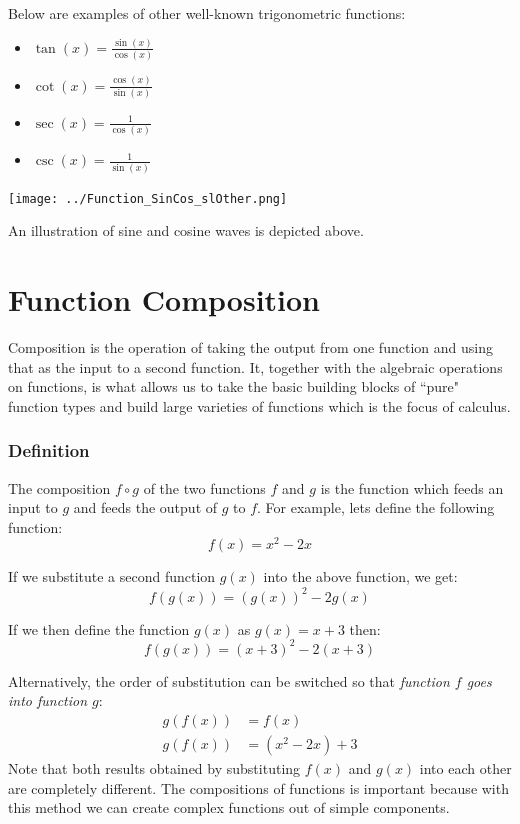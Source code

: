 \documentclass[11pt,oneside]{book}              %
\begin{document}
Below are examples of other well-known trigonometric functions:
\begin{itemize}
	\item $\tan(x) = \frac{\sin(x)}{\cos(x)}$
	\item $\cot(x) = \frac{\cos(x)}{\sin(x)}$
	\item $\sec(x) = \frac{1}{\cos(x)}$
	\item $\csc(x) = \frac{1}{\sin(x)}$
\end{itemize}

\begin{center}\texttt{[image: ../Function\_SinCos\_slOther.png]} \end{center}
An illustration of sine and cosine waves is depicted above.

\section{Function Composition}
Composition is the operation of taking the output from one function and using that as the input to a second function. It, together with the algebraic operations on functions, is what allows us to take the basic building blocks of ``pure" function types and build large varieties of functions which is the focus of calculus.

\subsubsection{Definition}
The composition $f \circ g$ of the two functions $f$ and $g$ is the function which feeds an input to $g$ and feeds the output of $g$ to $f$. For example, lets define the following function:
\begin{equation*}
	f(x) = x^2 − 2x
\end{equation*}

If we substitute a second function $g(x)$ into the above function, we get:
\begin{equation*}
	f(g(x)) = (g(x))^2 - 2g(x)
\end{equation*}

If we then define the function $g(x)$ as $g(x) = x + 3$ then:
\begin{equation*}
	f(g(x)) = (x + 3)^2 - 2(x+3)
\end{equation*}

Alternatively, the order of substitution can be switched so that \textit{function $f$ goes into function $g$}:
\begin{align}
	g(f(x)) &= f(x)\\
	g(f(x)) &= (x^2 - 2x) + 3
\end{align}
Note that both results obtained by substituting $f(x)$ and $g(x)$ into each other are completely different. The compositions of functions is important because with this method we can create complex functions out of simple components.
\end{document}

